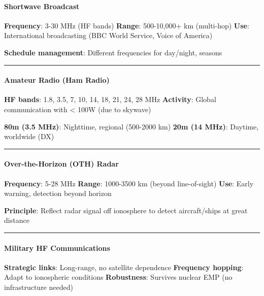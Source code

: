 \paragraph{Shortwave Broadcast}\label{shortwave-broadcast}

\textbf{Frequency}: 3-30 MHz (HF bands) \textbf{Range}: 500-10,000+ km
(multi-hop) \textbf{Use}: International broadcasting (BBC World Service,
Voice of America)

\textbf{Schedule management}: Different frequencies for day/night,
seasons

\begin{center}\rule{0.5\linewidth}{0.5pt}\end{center}

\paragraph{Amateur Radio (Ham Radio)}\label{amateur-radio-ham-radio}

\textbf{HF bands}: 1.8, 3.5, 7, 10, 14, 18, 21, 24, 28 MHz
\textbf{Activity}: Global communication with \textless{} 100W (due to
skywave)

\textbf{80m (3.5 MHz)}: Nighttime, regional (500-2000 km) \textbf{20m
(14 MHz)}: Daytime, worldwide (DX)

\begin{center}\rule{0.5\linewidth}{0.5pt}\end{center}

\paragraph{Over-the-Horizon (OTH)
Radar}\label{over-the-horizon-oth-radar}

\textbf{Frequency}: 5-28 MHz \textbf{Range}: 1000-3500 km (beyond
line-of-sight) \textbf{Use}: Early warning, detection beyond horizon

\textbf{Principle}: Reflect radar signal off ionosphere to detect
aircraft/ships at great distance

\begin{center}\rule{0.5\linewidth}{0.5pt}\end{center}

\paragraph{Military HF Communications}\label{military-hf-communications}

\textbf{Strategic links}: Long-range, no satellite dependence
\textbf{Frequency hopping}: Adapt to ionospheric conditions
\textbf{Robustness}: Survives nuclear EMP (no infrastructure needed)

